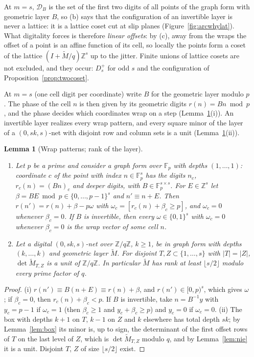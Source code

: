\documentclass[11pt]{amsart}
\newtheorem{lemma}[theorem]{Lemma}
\theoremstyle{definition}
\theoremstyle{plain}
\newcommand{\Z}{\mathbb{Z}}
\newcommand{\F}{\mathbb{F}}
\begin{document}
At $m=s$, $\mathcal D_B$ is the set of the first two digits of all points of the graph form with geometric layer $B$, so (b) says that the configuration of an invertible layer is never a lattice: it is a lattice coset cut at slip planes (Figure~\ref{fig:arcwhylat}). What digitality forces is therefore \emph{linear offsets}: by (c), away from the wraps the offset of a point is an affine function of its cell, so locally the points form a coset of the lattice $(I+\tilde M/q)\Z^s$ up to the jitter. Finite unions of lattice cosets are not excluded, and they occur: $D_s^+$ for odd $s$ and the configuration of Proposition~\ref{prop:twocoset}.

At $m=s$ (one cell digit per coordinate) write $B$ for the geometric layer modulo $p$. The phase of the cell $n$ is then given by its geometric digits $r(n)=Bn\bmod p$, and the phase decides which coordinates wrap on a step (Lemma~\ref{lem:phase}(i)). An invertible layer realizes every wrap pattern, and every square minor of the layer of a $(0,sk,s)$-net with disjoint row and column sets is a unit (Lemma~\ref{lem:phase}(ii)).

\begin{lemma}[Wrap patterns; rank of the layer]\label{lem:phase}
\begin{enumerate}
\item[(i)] Let $p$ be a prime and consider a graph form over $\F_p$ with depths $(1,\dots,1)$: coordinate $c$ of the point with index $n\in\F_p^s$ has the digits $n_c$, $r_c(n)=(Bn)_c$ and deeper digits, with $B\in\F_p^{s\times s}$. For $E\in\Z^s$ let $\beta=BE\bmod p\in\{0,\dots,p-1\}^s$ and $n'\equiv n+E$. Then $r(n')=r(n)+\beta-p\omega$ with $\omega_c=[r_c(n)+\beta_c\ge p]$, and $\omega_c=0$ whenever $\beta_c=0$. If $B$ is invertible, then every $\omega\in\{0,1\}^s$ with $\omega_c=0$ whenever $\beta_c=0$ is the wrap vector of some cell $n$.
\item[(ii)] Let a digital $(0,sk,s)$-net over $\Z/q\Z$, $k\ge1$, be in graph form with depths $(k,\dots,k)$ and geometric layer $\tilde M$. For disjoint $T,Z\subset\{1,\dots,s\}$ with $|T|=|Z|$, $\det\tilde M_{T,Z}$ is a unit of $\Z/q\Z$. In particular $\tilde M$ has rank at least $\lfloor s/2\rfloor$ modulo every prime factor of $q$.
\end{enumerate}
\end{lemma}

\begin{proof}
(i) $r(n')\equiv B(n+E)\equiv r(n)+\beta$, and $r(n')\in[0,p)^s$, which gives $\omega$; if $\beta_c=0$, then $r_c(n)+\beta_c<p$. If $B$ is invertible, take $n=B^{-1}y$ with $y_c=p-1$ if $\omega_c=1$ (then $\beta_c\ge1$ and $y_c+\beta_c\ge p$) and $y_c=0$ if $\omega_c=0$. (ii) The box with depths $k+1$ on $T$, $k-1$ on $Z$ and $k$ elsewhere has total depth $sk$; by Lemma~\ref{lem:box} its minor is, up to sign, the determinant of the first offset rows of $T$ on the last level of $Z$, which is $\det\tilde M_{T,Z}$ modulo $q$, and by Lemma~\ref{lem:nie} it is a unit. Disjoint $T$, $Z$ of size $\lfloor s/2\rfloor$ exist.
\end{proof}
\end{document}

